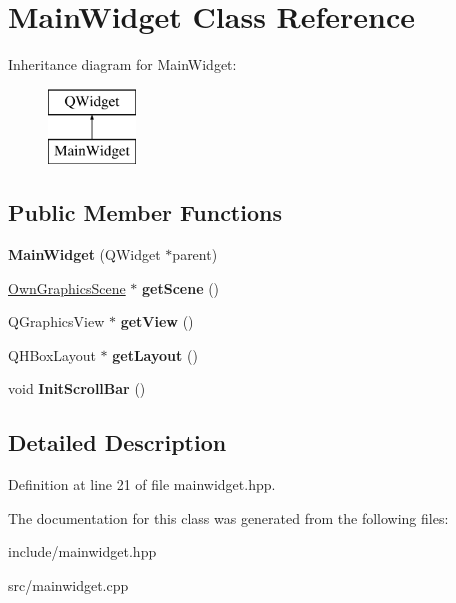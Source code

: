 \hypertarget{classMainWidget}{}\section{Main\+Widget Class Reference}
\label{classMainWidget}
Inheritance diagram for Main\+Widget\+:\begin{figure}[H]
\begin{center}
\leavevmode
\includegraphics[height=2.000000cm]{classMainWidget}
\end{center}
\end{figure}
\subsection*{Public Member Functions}
\begin{DoxyCompactItemize}
\item 
\mbox{\label{classMainWidget_a62f5aa5fe2314c6221ac49b328b72e8b}} 
{\bfseries Main\+Widget} (Q\+Widget $\ast$parent)
\item 
\mbox{\label{classMainWidget_ad40a8bd13b501a0ebe88c87426a5b591}} 
\mbox{\hyperlink{classOwnGraphicsScene}{Own\+Graphics\+Scene}} $\ast$ {\bfseries get\+Scene} ()
\item 
\mbox{\label{classMainWidget_ae73e3dac6fb1e99dabe84aab683b3fbd}} 
Q\+Graphics\+View $\ast$ {\bfseries get\+View} ()
\item 
\mbox{\label{classMainWidget_a639b465bb49eb31e1c09051ae047951f}} 
Q\+H\+Box\+Layout $\ast$ {\bfseries get\+Layout} ()
\item 
\mbox{\label{classMainWidget_af544f3b04a81d63c0810a90706773d3d}} 
void {\bfseries Init\+Scroll\+Bar} ()
\end{DoxyCompactItemize}


\subsection{Detailed Description}


Definition at line 21 of file mainwidget.\+hpp.



The documentation for this class was generated from the following files\+:\begin{DoxyCompactItemize}
\item 
include/mainwidget.\+hpp\item 
src/mainwidget.\+cpp\end{DoxyCompactItemize}
